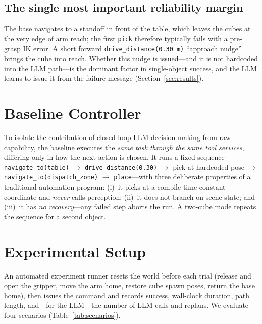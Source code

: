 \documentclass[conference]{IEEEtran}
\begin{document}
\subsection{The single most important reliability margin}
The base navigates to a standoff in front of the table, which leaves the cubes at
the very edge of arm reach; the first \texttt{pick} therefore typically fails with
a pre-grasp IK error. A short forward \texttt{drive\_distance(0.30\,m)} ``approach
nudge'' brings the cube into reach. Whether this nudge is issued---and it is not
hardcoded into the LLM path---is the dominant factor in single-object success, and
the LLM learns to issue it from the failure message (Section~\ref{sec:results}).

\section{Baseline Controller}\label{sec:baseline}
To isolate the contribution of closed-loop LLM decision-making from raw
capability, the baseline executes the \emph{same task through the same tool
services}, differing only in how the next action is chosen. It runs a fixed
sequence---\texttt{navigate\_to(table)} $\rightarrow$
\texttt{drive\_distance(0.30)} $\rightarrow$ pick-at-hardcoded-pose $\rightarrow$
\texttt{navigate\_to(dispatch\_zone)} $\rightarrow$ \texttt{place}---with three
deliberate properties of a traditional automation program: (i)~it picks at a
compile-time-constant coordinate and \emph{never} calls perception; (ii)~it does
not branch on scene state; and (iii)~it has \emph{no recovery}---any failed step
aborts the run. A two-cube mode repeats the sequence for a second object.

\section{Experimental Setup}\label{sec:experiments}
An automated experiment runner resets the world before each trial (release and
open the gripper, move the arm home, restore cube spawn poses, return the base
home), then issues the command and records success, wall-clock duration, path
length, and---for the LLM---the number of LLM calls and replans. We evaluate four
scenarios (Table~\ref{tab:scenarios}).
\end{document}
